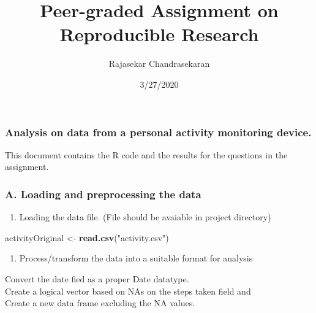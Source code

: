 \documentclass[
]{article}
\title{Peer-graded Assignment on Reproducible Research}
\author{Rajasekar Chandrasekaran}
\date{3/27/2020}
\newenvironment{Shaded}{\begin{snugshade}}{\end{snugshade}}
\newcommand{\DecValTok}[1]{\textcolor[rgb]{0.00,0.00,0.81}{#1}}
\newcommand{\KeywordTok}[1]{\textcolor[rgb]{0.13,0.29,0.53}{\textbf{#1}}}
\newcommand{\NormalTok}[1]{#1}
\newcommand{\OperatorTok}[1]{\textcolor[rgb]{0.81,0.36,0.00}{\textbf{#1}}}
\newcommand{\StringTok}[1]{\textcolor[rgb]{0.31,0.60,0.02}{#1}}
\providecommand{\tightlist}{%
  \setlength{\itemsep}{0pt}\setlength{\parskip}{0pt}}
\begin{document}
\maketitle

\hypertarget{analysis-on-data-from-a-personal-activity-monitoring-device.}{%
\subsubsection{Analysis on data from a personal activity monitoring
device.}\label{analysis-on-data-from-a-personal-activity-monitoring-device.}}

This document contains the R code and the results for the questions in
the assignment.

\hypertarget{a.-loading-and-preprocessing-the-data}{%
\subsubsection{A. Loading and preprocessing the
data}\label{a.-loading-and-preprocessing-the-data}}

\begin{enumerate}
\def\labelenumi{\arabic{enumi}.}
\tightlist
\item
  Loading the data file. (File should be avaiable in project directory)
\end{enumerate}

\begin{Shaded}
\begin{Highlighting}[]
\NormalTok{activityOriginal <-}\StringTok{ }\KeywordTok{read.csv}\NormalTok{(}\StringTok{"activity.csv"}\NormalTok{)}
\end{Highlighting}
\end{Shaded}

\begin{enumerate}
\def\labelenumi{\arabic{enumi}.}
\setcounter{enumi}{1}
\tightlist
\item
  Process/transform the data into a suitable format for analysis
\end{enumerate}

Convert the date fied as a proper Date datatype.\\
Create a logical vector based on NAs on the steps taken field and\\
Create a new data frame excluding the NA values.

\begin{Shaded}
\end{Shaded}
\end{document}
